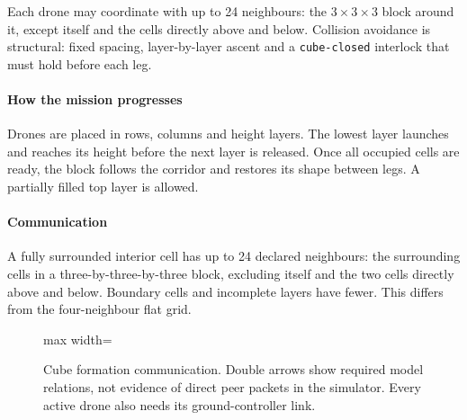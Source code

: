 \documentclass[11pt,a4paper,oneside]{report}
\newcommand{\code}[1]{\texttt{#1}}
\begin{document}
\noindent Each drone may coordinate with up to 24 neighbours: the $3\times3\times3$ block around
it, except itself and the cells directly above and below. Collision avoidance is structural:
fixed spacing, layer-by-layer ascent and a \code{cube-closed} interlock that must hold before
each leg.


\paragraph{How the mission progresses}
Drones are placed in rows, columns and height layers. The lowest layer launches and reaches its height before the next layer is released. Once all occupied cells are ready, the block follows the corridor and restores its shape between legs. A partially filled top layer is allowed.

\paragraph{Communication}
A fully surrounded interior cell has up to 24 declared neighbours: the surrounding cells in a three-by-three-by-three block, excluding itself and the two cells directly above and below. Boundary cells and incomplete layers have fewer. This differs from the four-neighbour flat grid.

\begin{figure}[H]
\centering
\begin{adjustbox}{max width=\linewidth}
\end{adjustbox}
\caption[Cube formation communication]{Cube formation communication. Double arrows show required model
relations, not evidence of direct peer packets in the simulator. Every active drone
also needs its ground-controller link.}
\label{fig:comm-cube}
\end{figure}
\end{document}
